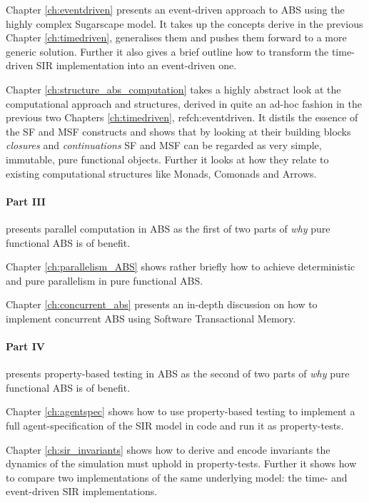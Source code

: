 Chapter \ref{ch:eventdriven} presents an event-driven approach to ABS using the highly complex Sugarscape model. It takes up the concepts derive in the previous Chapter \ref{ch:timedriven}, generalises them and pushes them forward to a more generic solution. Further it also gives a brief outline how to transform the time-driven SIR implementation into an event-driven one.

\medskip

Chapter \ref{ch:structure_abs_computation} takes a highly abstract look at the computational approach and structures, derived in quite an ad-hoc fashion in the previous two Chapters \ref{ch:timedriven}, ref{ch:eventdriven}. It distils the essence of the SF and MSF constructs and shows that by looking at their building blocks \textit{closures} and \textit{continuations} SF and MSF can be regarded as very simple, immutable, pure functional objects. Further it looks at how they relate to existing computational structures like Monads, Comonads and Arrows.

\medskip

\paragraph{Part III} presents parallel computation in ABS as the first of two parts of \textit{why} pure functional ABS is of benefit.
\medskip

Chapter \ref{ch:parallelism_ABS} shows rather briefly how to achieve deterministic and pure parallelism in pure functional ABS. 

\medskip

Chapter \ref{ch:concurrent_abs} presents an in-depth discussion on how to implement concurrent ABS using Software Transactional Memory.

\medskip

\paragraph{Part IV} presents property-based testing in ABS as the second of two parts of \textit{why} pure functional ABS is of benefit.
\medskip

Chapter \ref{ch:agentspec} shows how to use property-based testing to implement a full agent-specification of the SIR model in code and run it as property-tests.

\medskip

Chapter \ref{ch:sir_invariants} shows how to derive and encode invariants the dynamics of the simulation must uphold in property-tests. Further it shows how to compare two implementations of the same underlying model: the time- and event-driven SIR implementations.

